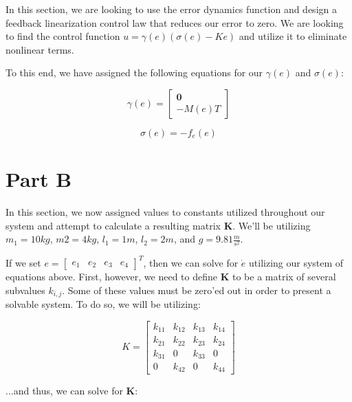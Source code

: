 \documentclass{article}
\begin{document}
In this section, we are looking to use the error dynamics function and design a feedback linearization control law that reduces our error to zero. We are looking to find the control function $u = \gamma(e)(\sigma(e)-Ke)$ and utilize it to eliminate nonlinear terms.

To this end, we have assigned the following equations for our $\gamma(e)$ and $\sigma(e)$:

\begin{equation}
    \gamma(e) = \begin{bmatrix}
        \boldsymbol{0} \\
        -M(e)T
    \end{bmatrix}
\end{equation}

\begin{equation}
    \sigma(e) = -f_e(e)
\end{equation}


\section*{Part B}

In this section, we now assigned values to constants utilized throughout our system and attempt to calculate a resulting matrix $\boldsymbol{K}$. We'll be utilizing $m_1 = 10 kg$, $m2 = 4kg$, $l_1=1m$, $l_2=2m$, and $g=9.81\frac{m}{s^2}$.

If we set $e=\begin{bmatrix}
    e_1 & e_2 & e_3 & e_4
\end{bmatrix}^T$, then we can solve for $\dot{e}$ utilizing our system of equations above. First, however, we need to define $\boldsymbol{K}$ to be a matrix of several subvalues $k_{i,j}$. Some of these values must be zero'ed out in order to present a solvable system. To do so, we will be utilizing:

\begin{equation}
    K = \begin{bmatrix}
        k_{11}  & k_{12}  & k_{13}  & k_{14} \\
        k_{21}  & k_{22}  & k_{23}  & k_{24} \\
        k_{31}  & 0 & k_{33}  & 0\\
        0 & k_{42}  & 0 & k_{44} 
        \end{bmatrix}
\end{equation}

...and thus, we can solve for $\boldsymbol{K}$:
\end{document}
